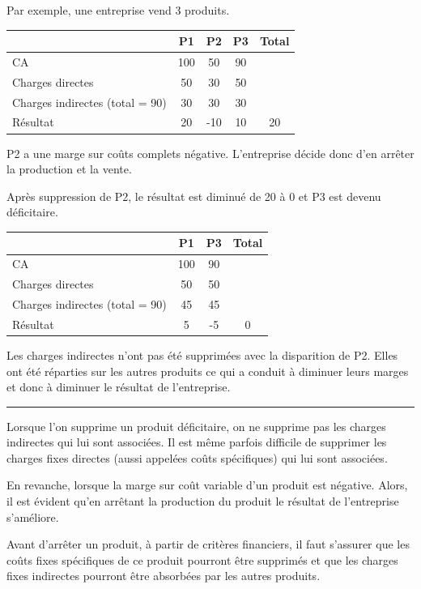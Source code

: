\documentclass[oneside]{kaobook}
\begin{document}
Par exemple, une entreprise vend 3 produits.
\begin{center}
\footnotesize
\begin{tabular}{l c c c c}
 & P1 & P2 & P3 & Total\\
\hline
CA & 100 & 50 & 90 & \\
Charges directes & 50 & 30 & 50 & \\
Charges indirectes (total = 90) & 30 & 30 & 30 & \\
Résultat & 20 & -10 & 10 & 20\\
\end{tabular}
\end{center}

P2 a une marge sur coûts complets négative. L'entreprise décide donc d'en arrêter la production et la vente.

Après suppression de P2, le résultat est diminué de 20 à 0 et P3 est devenu déficitaire.
\begin{center}
\footnotesize
\begin{tabular}{l c c c}
 & P1 & P3 & Total\\
\hline
CA & 100 & 90 & \\
Charges directes & 50 & 50 & \\
Charges indirectes (total = 90) & 45 & 45 & \\
Résultat & 5 & -5 & 0\\
\end{tabular}
\end{center}

Les charges indirectes n'ont pas été supprimées avec la disparition de P2. Elles ont été réparties sur les autres produits ce qui a conduit à diminuer leurs marges et donc à diminuer le résultat de l'entreprise.

\noindent\rule{\textwidth}{0.5pt}

Lorsque l'on supprime un produit déficitaire, on ne supprime pas les charges indirectes qui lui sont associées. Il est même parfois difficile de supprimer les charges fixes directes (aussi appelées coûts spécifiques) qui lui sont associées.

En revanche, lorsque la marge sur coût variable d'un produit est négative. Alors, il est évident qu'en arrêtant la production du produit le résultat de l'entreprise s'améliore.

\begin{kaowarn}
Avant d'arrêter un produit, à partir de critères financiers, il faut s'assurer que les coûts fixes spécifiques de ce produit pourront être supprimés et que les charges fixes indirectes pourront être absorbées par les autres produits.
\end{kaowarn}
\end{document}
